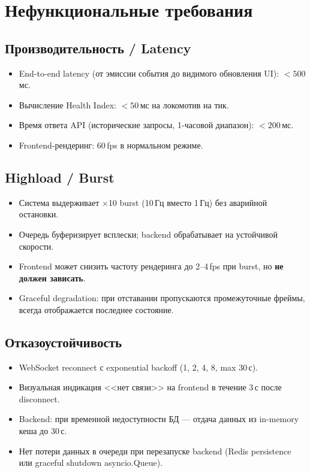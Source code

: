\documentclass[12pt,a4paper]{article}
\begin{document}
\section{Нефункциональные требования}

\subsection{Производительность / Latency}

\begin{itemize}[nosep]
  \item End-to-end latency (от эмиссии события до видимого обновления UI): $< 500$\,мс.
  \item Вычисление Health Index: $< 50$\,мс на локомотив на тик.
  \item Время ответа API (исторические запросы, 1-часовой диапазон): $< 200$\,мс.
  \item Frontend-рендеринг: 60\,fps в нормальном режиме.
\end{itemize}

\subsection{Highload / Burst}

\begin{itemize}[nosep]
  \item Система выдерживает $\times$10 burst (10\,Гц вместо 1\,Гц) без аварийной остановки.
  \item Очередь буферизирует всплески; backend обрабатывает на устойчивой скорости.
  \item Frontend может снизить частоту рендеринга до 2--4\,fps при burst, но \textbf{не должен зависать}.
  \item Graceful degradation: при отставании пропускаются промежуточные фреймы, всегда отображается последнее состояние.
\end{itemize}

\subsection{Отказоустойчивость}

\begin{itemize}[nosep]
  \item WebSocket reconnect с exponential backoff (1, 2, 4, 8, max 30\,с).
  \item Визуальная индикация <<нет связи>> на frontend в течение 3\,с после disconnect.
  \item Backend: при временной недоступности БД --- отдача данных из in-memory кеша до 30\,с.
  \item Нет потери данных в очереди при перезапуске backend (Redis persistence или graceful shutdown asyncio.Queue).
\end{itemize}
\end{document}
